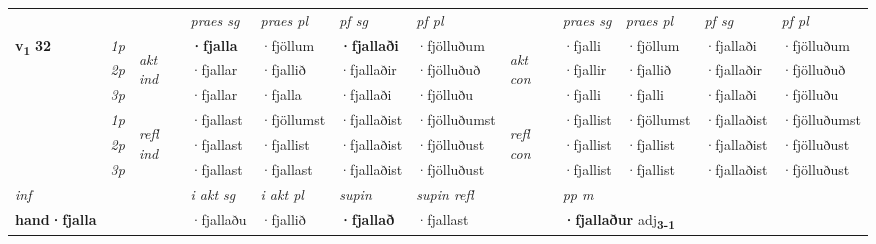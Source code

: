 \begin{longtable}[l]{X>{\footnotesize\itshape}llXXXXlXXXX}
\midrule

 & &   & \textit{praes sg}  & \textit{praes pl}    & \textit{ pf sg} & \textit{pf pl} & & \textit{praes sg}  & \textit{praes pl}    & \textit{pf sg} & \textit{pf pl }  \\ \cmidrule{4-7} \cmidrule{9-12}
 \multirow{2}{*}{{{\textbf{v{\textsubscript{1}}} \Large{\textbf{32}}}}}  & 1p & \multirow{3}{*}{\begin{turn}{90}\textit{akt ind}\end{turn}} & \textbf{·fjalla} & ·fjöllum & \textbf{·fjallaði} & ·fjölluðum & \multirow{3}{*}{\begin{turn}{90}\textit{akt con}\end{turn}} &·fjalli & ·fjöllum & ·fjallaði & ·fjölluðum\\*
 & 2p &  &  ·fjallar  & ·fjallið & ·fjallaðir & ·fjölluðuð & & ·fjallir & ·fjallið & ·fjallaðir & ·fjölluðuð \\*
 & 3p &  & ·fjallar & ·fjalla & ·fjallaði & ·fjölluðu & & ·fjalli & ·fjalli& ·fjallaði & ·fjölluðu \\*
\cmidrule{4-7} \cmidrule{9-12}
 & 1p & \multirow{3}{*}{\begin{turn}{90}\textit{refl ind}\end{turn}}  & ·fjallast & ·fjöllumst & ·fjallaðist & ·fjölluðumst & \multirow{3}{*}{\begin{turn}{90}\textit{refl con}\end{turn}}  &·fjallist & ·fjöllumst & ·fjallaðist & ·fjölluðumst \\*
 & 2p &  & ·fjallast & ·fjallist & ·fjallaðist & ·fjölluðust & &·fjallist & ·fjallist & ·fjallaðist & ·fjölluðust \\*
 & 3p  & & ·fjallast & ·fjallast & ·fjallaðist & ·fjölluðust & & ·fjallist & ·fjallist& ·fjallaðist & ·fjölluðust \\*
\cmidrule{4-7} \cmidrule{9-12}

   {\textit{inf}} & &  & \textit{i akt sg} & \textit{i akt pl}    & \textit{supin} & \textit{supin refl} && \textit{pp m} \\*
  {\textbf{hand\allowbreak ·fjalla}} & && ·fjallaðu  & ·fjallið    &  \textbf{·fjallað} & ·fjallast && \multicolumn{2}{l}{\textbf{·fjallaður} adj\textbf{\textsubscript{3-1}}} \\*

\midrule


\end{longtable}
